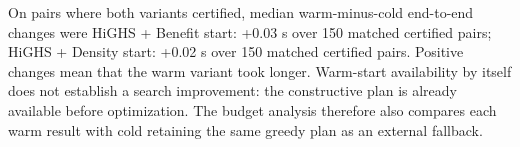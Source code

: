 On pairs where both variants certified, median warm-minus-cold end-to-end changes were HiGHS + Benefit start: +0.03 s over 150 matched certified pairs; HiGHS + Density start: +0.02 s over 150 matched certified pairs. Positive changes mean that the warm variant took longer. 
Warm-start availability by itself does not establish a search improvement:
the constructive plan is already available before optimization. The budget
analysis therefore also compares each warm result with cold retaining the
same greedy plan as an external fallback.



